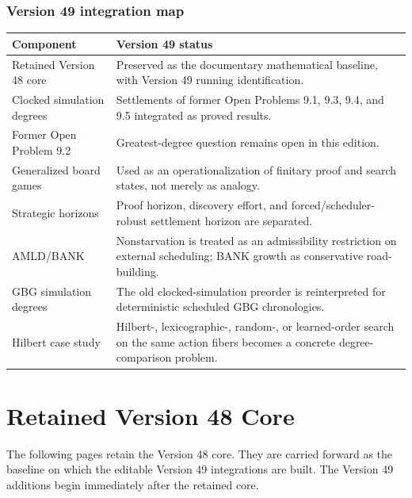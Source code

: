 \documentclass[11pt]{article}
\theoremstyle{remark}
\newcommand{\vfortynineoverlay}{%
  \thispagestyle{empty}%
  \begin{tikzpicture}[remember picture,overlay]
    \fill[white] (current page.north west) rectangle ([yshift=-0.56in]current page.north east);
    \draw[line width=0.35pt] ([xshift=0.55in,yshift=-0.51in]current page.north west) --
      ([xshift=-0.55in,yshift=-0.51in]current page.north east);
    \node[anchor=north west,font=\scriptsize] at
      ([xshift=0.55in,yshift=-0.16in]current page.north west)
      {Depths of Induction and Formalized Self-Awareness};
    \node[anchor=north east,font=\scriptsize] at
      ([xshift=-0.55in,yshift=-0.16in]current page.north east)
      {Version 49 retained Version 48 core};
    \node[anchor=south,font=\tiny,text=gray!80!black] at
      ([yshift=0.13in]current page.south)
      {Retained Version 48 core; the editable Version 49 integrations following it state the new claims of this edition.};
  \end{tikzpicture}%
}
\begin{document}
\section*{Version 49 integration map}
\begin{longtable}{p{}p{}}
\toprule
\textbf{Component} & \textbf{Version 49 status}\\
\midrule
Retained Version 48 core &
Preserved as the documentary mathematical baseline, with Version 49 running identification.\\
Clocked simulation degrees &
Settlements of former Open Problems 9.1, 9.3, 9.4, and 9.5 integrated as proved results.\\
Former Open Problem 9.2 &
Greatest-degree question remains open in this edition.\\
Generalized board games &
Used as an operationalization of finitary proof and search states, not merely as analogy.\\
Strategic horizons &
Proof horizon, discovery effort, and forced/scheduler-robust settlement horizon are separated.\\
AMLD/BANK &
Nonstarvation is treated as an admissibility restriction on external scheduling; BANK growth as conservative road-building.\\
GBG simulation degrees &
The old clocked-simulation preorder is reinterpreted for deterministic scheduled GBG chronologies.\\
Hilbert case study &
Hilbert-, lexicographic-, random-, or learned-order search on the same action fibers becomes a concrete degree-comparison problem.\\
\bottomrule
\end{longtable}

\tableofcontents
\clearpage
{}

\part*{Retained Version 48 Core}
The following pages retain the Version 48 core. They are carried forward as the baseline on which the
editable Version 49 integrations are built. The Version 49 additions begin immediately after the retained core.

\hypersetup{pageanchor=false}

\hypersetup{pageanchor=true}
\clearpage
\end{document}
